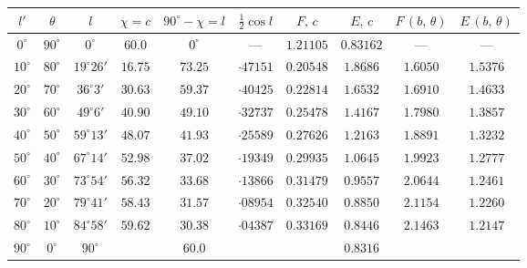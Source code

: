 \documentclass[11pt,a4paper]{article}
\theoremstyle{plain}
\theoremstyle{definition}
\begin{document}
\begin{center}
\small
\begin{tabular}{c|c|c|c|c|c|c|c|c|c}
\toprule
\parbox{0.6cm}{\centering $l'$} &
\parbox{0.6cm}{\centering $\theta$} &
\parbox{1cm}{\centering $l$} &
\parbox{1cm}{\centering $\chi = c$} &
\parbox{1.2cm}{\centering $90^\circ-\chi=l$} &
\parbox{0.8cm}{\centering $\tfrac{1}{2}\cos l$} &
\parbox{1cm}{\centering $F,\,c$} &
\parbox{1cm}{\centering $E,\,c$} &
\parbox{1.2cm}{\centering $F\,(b,\,\theta)$} &
\parbox{1.2cm}{\centering $E\,(b,\,\theta)$} \\
\midrule
 $0^\circ$  & $90^\circ$  & $0^\circ$     & $60.0$    & $0^\circ$    & ---       & $1.21105$     & $0.83162$   & ---       & ---       \\
$10^\circ$  & $80^\circ$  & $19^\circ 26'$ & $16.75$   & $73.25$     & $\cdot47151$ & $0.20548$     & $1.8686$    & $1.6050$  & $1.5376$  \\
$20^\circ$  & $70^\circ$  & $36^\circ 3'$  & $30.63$   & $59.37$     & $\cdot40425$ & $0.22814$     & $1.6532$    & $1.6910$  & $1.4633$  \\
$30^\circ$  & $60^\circ$  & $49^\circ 6'$  & $40.90$   & $49.10$     & $\cdot32737$ & $0.25478$     & $1.4167$    & $1.7980$  & $1.3857$  \\
$40^\circ$  & $50^\circ$  & $59^\circ 13'$ & $48.07$   & $41.93$     & $\cdot25589$ & $0.27626$     & $1.2163$    & $1.8891$  & $1.3232$  \\
$50^\circ$  & $40^\circ$  & $67^\circ 14'$ & $52.98$   & $37.02$     & $\cdot19349$ & $0.29935$     & $1.0645$    & $1.9923$  & $1.2777$  \\
$60^\circ$  & $30^\circ$  & $73^\circ 54'$ & $56.32$   & $33.68$     & $\cdot13866$ & $0.31479$     & $0.9557$    & $2.0644$  & $1.2461$  \\
$70^\circ$  & $20^\circ$  & $79^\circ 41'$ & $58.43$   & $31.57$     & $\cdot08954$ & $0.32540$     & $0.8850$    & $2.1154$  & $1.2260$  \\
$80^\circ$  & $10^\circ$  & $84^\circ 58'$ & $59.62$   & $30.38$     & $\cdot04387$ & $0.33169$     & $0.8446$    & $2.1463$  & $1.2147$  \\
$90^\circ$  & $0^\circ$   & $90^\circ$     &           & $60.0$      &           &               & $0.8316$    &           &           \\
\bottomrule
\end{tabular}
\end{center}
\end{document}
